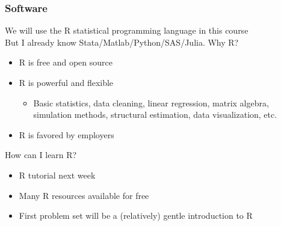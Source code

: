 \documentclass{beamer}
\begin{document}

\begin{frame}\frametitle{Software}
    We will use the R statistical programming language in this course \\
    \vspace{2ex}
    But I already know Stata/Matlab/Python/SAS/Julia. Why R?
    \begin{itemize}
        \item R is free and open source
        \item R is powerful and flexible
        \begin{itemize}
            \item Basic statistics, data cleaning, linear regression, matrix algebra, simulation methods, structural estimation, data visualization, etc.
        \end{itemize}
        \item R is favored by employers
    \end{itemize}
    \vspace{2ex}
    How can I learn R?
    \begin{itemize}
        \item R tutorial next week
        \item Many R resources available for free
        \item First problem set will be a (relatively) gentle introduction to R
    \end{itemize}
\end{frame}
\end{document}
